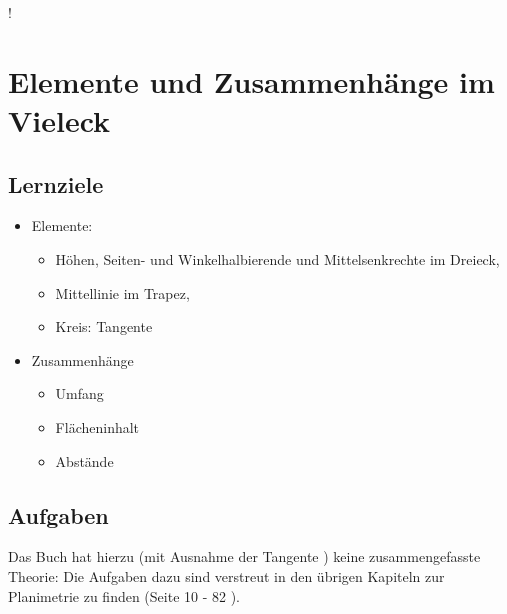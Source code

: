 \IstinVieleckeEingebundenWirdNichtVerwendet!

\section{Elemente und Zusammenhänge im Vieleck}



\subsection*{Lernziele}

\begin{itemize}
\item Elemente:
  \begin{itemize}
  \item Höhen, Seiten- und Winkelhalbierende und
    Mittelsenkrechte im Dreieck,
  \item Mittellinie im Trapez,
  \item Kreis: Tangente
  \end{itemize}
\item Zusammenhänge
  \begin{itemize}
  \item
    Umfang
  \item
    Flächeninhalt 
  \item
    Abstände
  \end{itemize}
\end{itemize}



\subsection*{Aufgaben}
Das Buch hat hierzu (mit Ausnahme der Tangente ) keine zusammengefasste Theorie: Die Aufgaben dazu sind verstreut in den übrigen Kapiteln zur Planimetrie zu finden (Seite 10 - 82 \cite{frommenwiler18geom}).
\newpage
